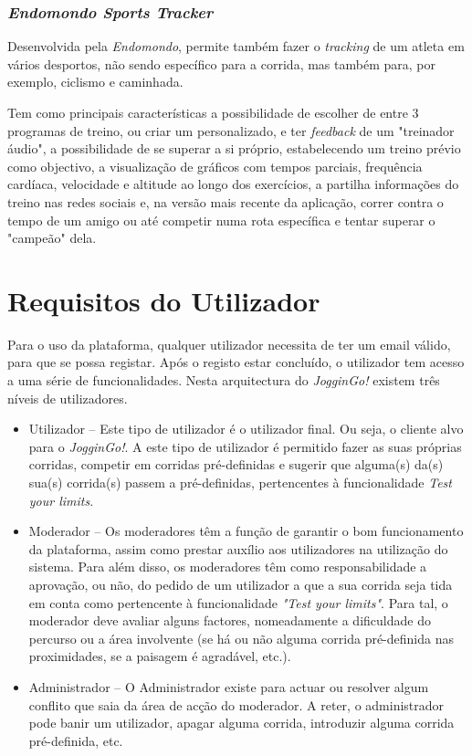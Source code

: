 \documentclass[twocolumn,twoside,10pt,a4paper]{article}
\begin{document}
\subsubsection{\emph{Endomondo Sports Tracker}}

Desenvolvida pela \textit{Endomondo}, permite também fazer o \textit{tracking} de um atleta em vários desportos, não sendo específico para a corrida, mas também para, por exemplo, ciclismo e caminhada.

Tem como principais características a possibilidade de escolher de entre 3 programas de treino, ou criar um personalizado, e ter \textit{feedback} de um "treinador áudio", a possibilidade de se superar a si próprio, estabelecendo um treino prévio como objectivo, a visualização de gráficos com tempos parciais, frequência cardíaca, velocidade e altitude ao longo dos exercícios, a partilha informações do treino nas redes sociais e, na versão mais recente da aplicação, correr contra o tempo de um amigo ou até competir numa rota específica e tentar superar o "campeão" dela.

\section{Requisitos do Utilizador}\label{sec:application}

Para o uso da plataforma, qualquer utilizador necessita de ter um email válido, para que se possa registar. Após o registo estar concluído, o utilizador tem acesso a uma série de funcionalidades. Nesta arquitectura do \textit{JogginGo!} existem três níveis de utilizadores.

\begin{itemize}
\item {Utilizador} -- Este tipo de utilizador é o utilizador final. Ou seja, o cliente alvo para o \textit{JogginGo!}. A este tipo de utilizador é permitido fazer as suas próprias corridas, competir em corridas pré-definidas e sugerir que alguma(s) da(s) sua(s) corrida(s) passem a pré-definidas, pertencentes à funcionalidade \textit{Test your limits}.
\item{Moderador} -- Os moderadores têm a função de garantir o bom funcionamento da plataforma, assim como prestar auxílio aos utilizadores na utilização do sistema. Para além disso, os moderadores têm como responsabilidade a aprovação, ou não, do pedido de um utilizador a que a sua corrida seja tida em conta como pertencente à funcionalidade \textit{"Test your limits"}. Para tal, o moderador deve avaliar alguns factores, nomeadamente a dificuldade do percurso ou a área involvente (se há ou não alguma corrida pré-definida nas proximidades, se a paisagem é agradável, etc.).
\item{Administrador} -- O Administrador existe para actuar ou resolver algum conflito que saia da área de acção do moderador. A reter, o administrador pode banir um utilizador, apagar alguma corrida, introduzir alguma corrida pré-definida, etc.
\end{itemize}
\end{document}

